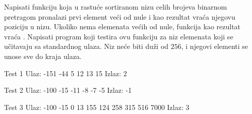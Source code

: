 \begin{Exercise}[label=310]
Napisati funkciju koja u rastuće sortiranom nizu celih brojeva
binarnom pretragom pronalazi prvi element veći od nule i kao
rezultat vraća njegovu poziciju u nizu. Ukoliko nema elemenata
većih od nule, funkcija kao rezultat vraća . Napisati
program koji testira ovu funkciju za niz elemenata koji se
učitavaju sa standardnog ulaza. Niz neće biti duži od
$256$, i njegovi elementi se unose sve do kraja ulaza.

\begin{minitest}
\begin{test}{Test 1}
Ulaz:  -151 -44 5 
       12 13 15
Izlaz: 2
\end{test}
\end{minitest}
\begin{minitest}
\begin{test}{Test 2}
Ulaz:  -100 -15 -11 
       -8 -7 -5
Izlaz: -1
\end{test}
\end{minitest}
\begin{minitest}
\begin{test}{Test 3}
Ulaz:  -100 -15 0 13 
       155 124 258 
       315 516 7000
Izlaz: 3
\end{test}
\end{minitest}
\end{Exercise}
\begin{Answer}[ref=310]
\end{Answer}

